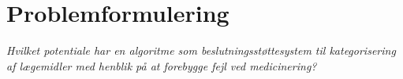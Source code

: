 \section{Problemformulering}
\textit{Hvilket potentiale har en algoritme som beslutningsstøttesystem til kategorisering af lægemidler med henblik på at forebygge fejl ved medicinering?}
